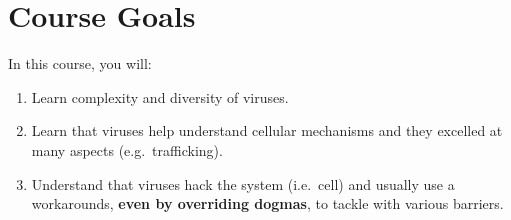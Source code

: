 \section{Course Goals}\label{course-goals}

In this course, you will:

\begin{enumerate}
\def\labelenumi{\arabic{enumi}.}
\item
  Learn complexity and diversity of viruses.
\item
  Learn that viruses help understand cellular mechanisms and they
  excelled at many aspects (e.g.~trafficking).
\item
  Understand that viruses hack the system (i.e.~cell) and usually use a
  workarounds, \textbf{even by overriding dogmas}, to tackle with
  various barriers.
\end{enumerate}
